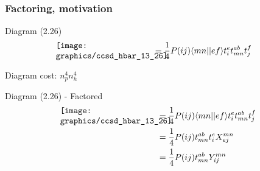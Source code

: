 \begin{frame}
    \frametitle{Factoring, motivation}

\small
\begin{block}{Diagram (2.26)}
    \begin{align*}
        \parbox{40mm}{\texttt{[image: graphics/ccsd\_hbar\_13\_26]}}
        &= \frac{1}{4} P(ij) \bra{mn}\ket{ef} t_i^e t_{mn}^{ab} t_j^f
    \end{align*}
\end{block}
Diagram cost: $n_p^4 n_h^4$
\begin{block}{Diagram (2.26) - Factored}
    \begin{align*}
        \parbox{40mm}{\texttt{[image: graphics/ccsd\_hbar\_13\_26]}}
        &= \frac{1}{4} P(ij) \bra{mn}\ket{ef} t_i^e t_{mn}^{ab} t_j^f \nn
        &= \frac{1}{4} P(ij) t_{mn}^{ab} t_i^e X_{ej}^{mn} \nn
        &= \frac{1}{4} P(ij) t_{mn}^{ab} Y^{mn}_{ij}
    \end{align*}
\end{block}
\end{frame}


